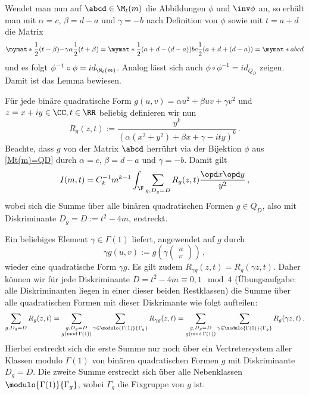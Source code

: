 \begin{bewe}
\begin{bewe}
Wendet man nun auf $\abcd \in \M_t(m)$ die Abbildungen $\phi$ und $\inv \phi$ an, so erhält man mit $\alpha = c$, $\beta = d - a$ und $\gamma = -b$ nach Definition von $\phi$ sowie mit $t = a+d$ die Matrix
\[
	\mymat* {\frac 12 (t - \beta)} {-\gamma} \alpha {\frac 12(t + \beta)} = \mymat* {\frac 12 (a + d - (d-a))}bc{\frac 12(a + d + (d-a))} = \mymat* abcd
\]
und es folgt $\phi^{-1} \circ \phi = id_{\M_t(m)}$. Analog lässt sich auch $\phi \circ \phi^{-1} = id_{Q_D}$ zeigen. Damit ist das Lemma bewiesen.
\end{bewe}

Für jede binäre quadratische Form $g(u, v) = \alpha u^2 + \beta uv + \gamma v^2$ und $z = x + iy \in \CC, t \in \RR$ beliebig definieren wir nun
\[
	R_g(z,t) := \frac {y^k} {\left( \alpha(x^2 + y^2) + \beta x + \gamma - ity \right)^k}
	\,.
\]
Beachte, dass $g$ von der Matrix $\abcd$ herrührt via der Bijektion $\phi$ aus \autoref{Mt(m)=QD} durch $\alpha = c$, $\beta = d - a$ und $\gamma = -b$. Damit gilt
\[
	I(m, t) = C_k^{-1} m^{k-1} \int_\F \sum_{g, D_g = D} R_g(z,t) \frac {\opd x \opd y}{y^2}
	\,,
\]
wobei sich die Summe über alle binären quadratischen Formen $g \in Q_D$, also mit Diskriminante $D_g = D := t^2 - 4m$, erstreckt.

Ein beliebiges Element $\gamma \in \Gamma(1)$ liefert, angewendet auf $g$ durch
\[
	\gamma g (u, v) := g \left( \gamma \begin{pmatrix}u\\v\end{pmatrix} \right)
	\,,
\]
wieder eine quadratische Form $\gamma g$. Es gilt zudem $R_{\gamma g} (z, t) = R_g (\gamma z, t)$. Daher können wir für jede Diskriminante $D = t^2 - 4m \equiv 0, 1 \mod 4$ (Übungsaufgabe: alle Diskriminanten liegen in einer dieser beiden Restklassen) die Summe über alle quadratischen Formen mit dieser Diskrimante wie folgt aufteilen:
\[
	\sum_{g, D_g = D} R_g (z, t) = \sum_{\substack{g, D_g = D \\ g (\operatorname{mod} \Gamma(1))}} \sum_{\gamma \in \modulo {\Gamma(1)} {\Gamma_g}} R_{\gamma g} (z,t) = \sum_{\substack{g, D_g = D \\ g (\operatorname{mod} \Gamma(1))}} \sum_{\gamma \in \modulo {\Gamma(1)} {\Gamma_g}} R_g (\gamma z,t)
	\,.
\]
Hierbei erstreckt sich die erste Summe nur noch über ein Vertretersystem aller Klassen modulo $\Gamma(1)$ von binären quadratischen Formen $g$ mit Diskriminante $D_g = D$. Die zweite Summe erstreckt sich über alle Nebenklassen $\modulo {\Gamma(1)}{\Gamma_g}$, wobei $\Gamma_g$ die Fixgruppe von $g$ ist. 


\end{bewe}
